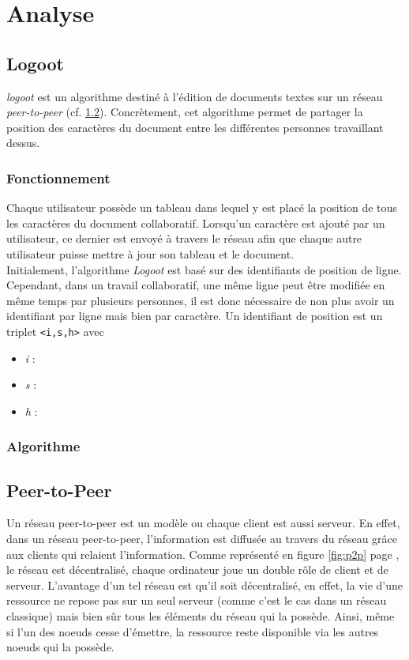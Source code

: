 \chapter{Analyse}

\section{Logoot}
	\emph{logoot} est un algorithme destiné à l'édition de documents textes sur
	un réseau \emph{peer-to-peer} (cf. \ref{sec:p2p}). Concrètement, cet
	algorithme permet de partager la position des caractères du document entre
	les différentes personnes travaillant dessus.
	
	\subsection{Fonctionnement}
		Chaque utilisateur possède un tableau dans lequel y est placé la
		position de tous les caractères du document collaboratif. Lorsqu'un
		caractère est ajouté par un utilisateur, ce dernier est envoyé à travers
		le réseau afin que chaque autre utilisateur puisse mettre à jour son
		tableau et le document.\\
		
		Initialement, l'algorithme \emph{Logoot} est basé sur des identifiants
		de position de ligne. Cependant, dans un travail collaboratif, une même
		ligne peut être modifiée en même temps par plusieurs personnes, il est
		donc nécessaire de non plus avoir un identifiant par ligne mais bien par
		caractère. Un identifiant de position est un triplet \verb+<i,s,h>+ avec 
		\begin{itemize}
			\item \emph{i} : 
			\item \emph{s} : 
			\item \emph{h} : 
		\end{itemize}
			
	\subsection{Algorithme}
		

\section{Peer-to-Peer}\label{sec:p2p}

	Un réseau peer-to-peer est un modèle ou chaque client est aussi serveur. En
	effet, dans un réseau peer-to-peer, l'information est diffusée au travers du
	réseau grâce aux clients qui relaient l'information. Comme représenté en
	figure \ref{fig:p2p} page \pageref{fig:p2p}, le réseau est décentralisé,
	chaque ordinateur joue un double rôle de client et de serveur. L'avantage
	d'un tel réseau est qu'il soit décentralisé, en effet, la vie d'une
	ressource ne repose pas sur un seul serveur (comme c'est le cas dans un
	réseau classique) mais bien sûr tous les éléments du réseau qui la possède.
	Ainsi, même si l'un des noeuds cesse d'émettre, la ressource reste
	disponible via les autres noeuds qui la possède.
	
